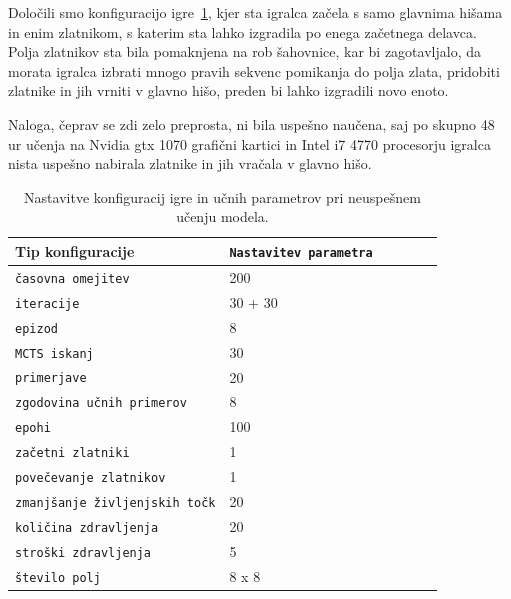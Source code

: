 \documentclass[a4paper, 12pt]{book}
\begin{document}
Določili smo konfiguracijo igre~\ref{tabelLearnConfig}, kjer sta igralca začela s samo glavnima hišama in enim zlatnikom, s katerim sta lahko izgradila po enega začetnega delavca.
Polja zlatnikov sta bila pomaknjena na rob šahovnice, kar bi zagotavljalo, da morata igralca izbrati mnogo pravih sekvenc pomikanja do polja zlata, pridobiti zlatnike in jih vrniti v glavno hišo, preden bi lahko izgradili novo enoto.

Naloga, čeprav se zdi zelo preprosta, ni bila uspešno naučena, saj po skupno 48 ur učenja na Nvidia gtx 1070 grafični kartici in Intel i7 4770 procesorju igralca nista uspešno nabirala zlatnike in jih vračala v glavno hišo.

\begin{table}
	\begin{center}
		\begin{tabular}{p{0.5\linewidth}|p{0.5\linewidth}}
			Tip konfiguracije                          & {\tt Nastavitev parametra} \\ \hline
			{\tt časovna omejitev}                     & 200                     \\
			{\tt iteracije}                            & 30 + 30                 \\
			{\tt epizod}                               & 8                       \\
			{\tt MCTS iskanj}                          & 30                      \\
			{\tt primerjave}                           & 20                      \\
			{\tt zgodovina učnih primerov}             & 8                       \\
			{\tt epohi}                                & 100                     \\
			{\tt začetni zlatniki}                     & 1                       \\
			{\tt povečevanje zlatnikov}                & 1                       \\
			{\tt zmanjšanje življenjskih točk}         & 20                      \\
			{\tt količina zdravljenja}                 & 20                      \\
			{\tt stroški zdravljenja}                  & 5                       \\
			{\tt število polj}                         & 8 x 8                   \\
			
		\end{tabular}
	\end{center}
	\caption{Nastavitve konfiguracij igre in učnih parametrov pri neuspešnem učenju modela.}
	\label{tabelLearnConfig}
\end{table}
\end{document}
